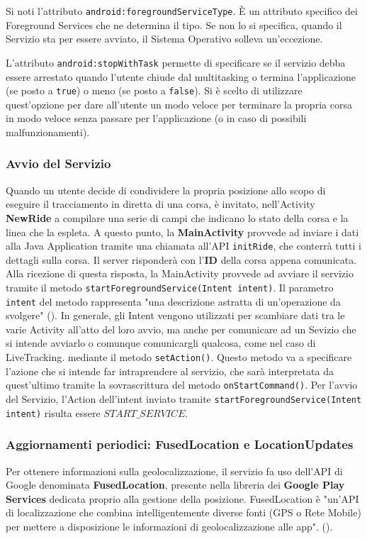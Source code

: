                     Si noti l'attributo \texttt{android:foregroundServiceType}. È un attributo specifico dei Foreground Services che ne determina il tipo. Se non lo si specifica, quando il Servizio sta per essere avviato, il Sistema Operativo solleva un'eccezione.

                    L'attributo \texttt{android:stopWithTask} permette di specificare se il servizio debba essere arrestato quando l'utente chiude dal multitasking o termina l'applicazione (se posto a \texttt{true}) o meno (se posto a \texttt{false}). Si è scelto di utilizzare quest'opzione per dare all'utente un modo veloce per terminare la propria corsa in modo veloce senza passare per l'applicazione (o in caso di possibili malfunzionamenti).


                    \subsubsection{Avvio del Servizio}
                        Quando un utente decide di condividere la propria posizione allo scopo di eseguire il tracciamento in diretta di una corsa, è invitato, nell'Activity \textbf{NewRide} a compilare una serie di campi che indicano lo stato della corsa e la linea che la espleta. A questo punto, la \textbf{MainActivity} provvede ad inviare i dati alla Java Application tramite una chiamata all'API \texttt{initRide}, che conterrà tutti i dettagli sulla corsa. Il server risponderà con l'\textbf{ID} della corsa appena comunicata. Alla ricezione di questa risposta, la MainActivity provvede ad avviare il servizio tramite il metodo \texttt{startForegroundService(Intent intent)}. Il parametro \texttt{intent} del metodo rappresenta "una descrizione astratta di un'operazione da svolgere" (\cite{AndroidIntent}). In generale, gli Intent vengono utilizzati per scambiare dati tra le varie Activity all'atto del loro avvio, ma anche per comunicare ad un Sevizio che si intende avviarlo o comunque comunicargli qualcosa, come nel caso di LiveTracking. mediante il metodo \texttt{setAction()}. Questo metodo va a specificare l'azione che si intende far intraprendere al servizio, che sarà interpretata da quest'ultimo tramite la sovrascrittura del metodo \texttt{onStartCommand()}. Per l'avvio del Servizio, l'Action dell'intent inviato tramite \texttt{startForegroundService(Intent intent)} risulta essere  
                        \texttt{$START\_SERVICE$}.
                    \subsubsection{Aggiornamenti periodici: FusedLocation e LocationUpdates}
                        Per ottenere informazioni sulla geolocalizzazione, il servizio fa uso dell'API di Google denominata \textbf{FusedLocation}, presente nella libreria dei \textbf{Google Play Services} dedicata proprio alla gestione della posizione.
                        FusedLocation è "un'API di localizzazione che combina intelligentemente diverse fonti (GPS o Rete Mobile) per mettere a disposizione le informazioni di geolocalizzazione alle app". (\cite{PlayServicesFusedLocation}).

